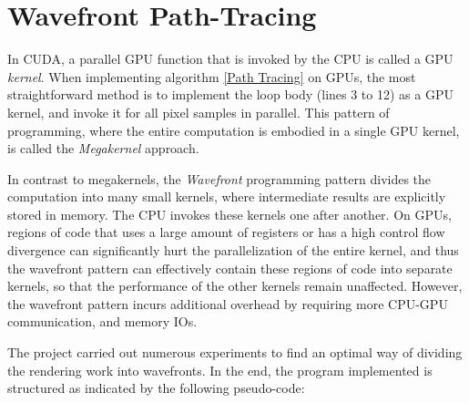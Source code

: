 


\section{Wavefront Path-Tracing}
In CUDA, a parallel GPU function that is invoked by the CPU is called a GPU \textit{kernel}. When implementing algorithm \ref{Path Tracing} on GPUs, the most straightforward method is to implement the loop body (lines 3 to 12) as a GPU kernel, and invoke it for all pixel samples in parallel. This pattern of programming, where the entire computation is embodied in a single GPU kernel, is called the \textit{Megakernel}\cite{megakernel} approach.

In contrast to megakernels, the \textit{Wavefront} programming pattern divides the computation into many small kernels, where intermediate results are explicitly stored in memory. The CPU invokes these kernels one after another. On GPUs, regions of code that uses a large amount of registers or has a high control flow divergence can significantly hurt the parallelization of the entire kernel, and thus the wavefront pattern can effectively contain these regions of code into separate kernels, so that the performance of the other kernels remain unaffected. However, the wavefront pattern incurs additional overhead by requiring more CPU-GPU communication, and memory IOs.

The project carried out numerous experiments to find an optimal way of dividing the rendering work into wavefronts. In the end, the program implemented is structured as indicated by the following pseudo-code:

